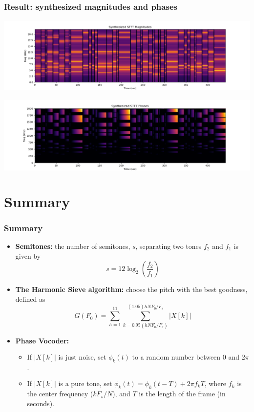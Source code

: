 \documentclass{beamer}
\begin{document}
\begin{frame}
  \frametitle{Result: synthesized magnitudes and phases}
  
  \centerline{\includegraphics[height=1.5in]{dft_magnitudes.png}}
  \centerline{\includegraphics[height=1.5in]{dft_phases.png}}
\end{frame}


\section[Summary]{Summary}
\setcounter{subsection}{1}

\begin{frame}
  \frametitle{Summary}
  \begin{itemize}
  \item {\bf Semitones:} the number of semitones, $s$, separating two
    tones $f_2$ and $f_1$ is given by
    \[
    s = 12\log_2\left(\frac{f_2}{f_1}\right)
    \]
  \item {\bf The Harmonic Sieve algorithm:} choose the pitch with the
    best goodness, defined as
    \[
    G(F_0) = \sum_{h=1}^{11}\sum_{k=0.95(hNF_0/F_s)}^{(1.05)hNF_0/F_s} |X[k]|
    \]
  \item {\bf Phase Vocoder:}
    \begin{itemize}
      \item If $|X[k]|$ is just noise, set $\phi_k(t)$ to a random number between $0$ and $2\pi$.
      \item If $|X[k]|$ is a pure tone, set
        $\phi_k(t)=\phi_k(t-T)+2\pi f_k T$, where $f_k$ is the center
        frequency ($kF_s/N$), and $T$ is the length of the frame (in
        seconds).
    \end{itemize}
  \end{itemize}
\end{frame}  
        
\end{document}
